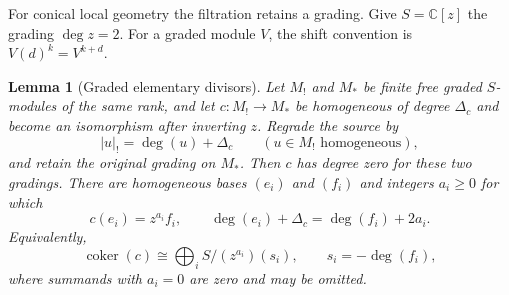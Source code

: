 \documentclass[11pt]{amsart}
\newtheorem{lemma}[theorem]{Lemma}
\theoremstyle{definition}
\theoremstyle{remark}
\begin{document}
For conical local geometry the filtration retains a grading.  Give
$S=\mathbb C[z]$ the grading $\deg z=2$.  For a graded module $V$, the shift
convention is $V(d)^k=V^{k+d}$.

\begin{lemma}[Graded elementary divisors]\label{lem:graded-smith}
Let $M_!$ and $M_*$ be finite free graded $S$-modules of the same rank, and
let $c:M_!\to M_*$ be homogeneous of degree $\Delta_c$ and become an
isomorphism after inverting $z$.  Regrade the source by
\[
 |u|_!=\deg(u)+\Delta_c
 \qquad(u\in M_!\text{ homogeneous}),
\]
and retain the original grading on $M_*$.  Then $c$ has degree zero for these
two gradings.  There are homogeneous bases $(e_i)$ and $(f_i)$ and integers
$a_i\geq0$ for which
\[
 c(e_i)=z^{a_i}f_i,
 \qquad
 \deg(e_i)+\Delta_c=\deg(f_i)+2a_i.
\]
Equivalently,
\[
 \operatorname{coker}(c)\cong
 \bigoplus_i S/(z^{a_i})(s_i),
 \qquad s_i=-\deg(f_i),
\]
where summands with $a_i=0$ are zero and may be omitted.
\end{lemma}
\end{document}
